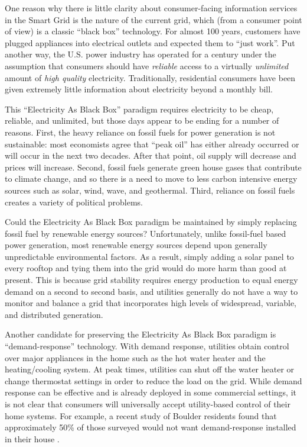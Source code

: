One reason why there is little clarity about consumer-facing information
services in the Smart Grid is the nature of the current grid, which (from a
consumer point of view) is a classic ``black box'' technology.  For almost
100 years, customers have plugged appliances into electrical outlets and
expected them to ``just work''.  Put another way, the U.S. power industry
has operated for a century under the assumption that consumers should have
{\em reliable} access to a virtually {\em unlimited} amount of {\em high
  quality} electricity.  Traditionally, residential consumers have been
given extremely little information about electricity beyond a monthly bill.

This ``Electricity As Black Box'' paradigm requires electricity to be cheap,
reliable, and unlimited, but those days appear to be ending for a number of
reasons.  First, the heavy reliance on fossil fuels for power generation is
not sustainable: most economists agree that ``peak oil'' has either already
occurred or will occur in the next two decades. After that point, oil
supply will decrease and prices will increase.  Second, fossil fuels
generate green house gases that contribute to climate change, and so there
is a need to move to less carbon intensive energy sources such as solar,
wind, wave, and geothermal.  Third, reliance on fossil fuels creates a
variety of political problems.

Could the Electricity As Black Box paradigm be maintained by simply
replacing fossil fuel by renewable energy sources? Unfortunately,
unlike fossil-fuel based power generation, most renewable energy sources
depend upon generally unpredictable environmental
factors.  As a result, simply adding a solar panel to every rooftop and
tying them into the grid would do more harm than good at present.
This is because grid stability requires energy production to equal energy demand
on a second to second basis, and utilities generally do not have a way to
monitor and balance a grid that incorporates high levels of widespread,
variable, and distributed generation. 

Another candidate for preserving the Electricity As Black Box paradigm
is ``demand-response'' technology.  With demand response,
utilities obtain control over major appliances in the home such as the hot
water heater and the heating/cooling system. At peak times, utilities can
shut off the water heater or change thermostat settings in order to reduce
the load on the grid.  While demand response can be effective and is
already deployed in some commercial settings, it is not clear that
consumers will universally accept utility-based control of their home
systems.  For example, a recent study of Boulder residents found that
approximately 50\% of those surveyed would not want demand-response
installed in their house \cite{Farhar09}.

